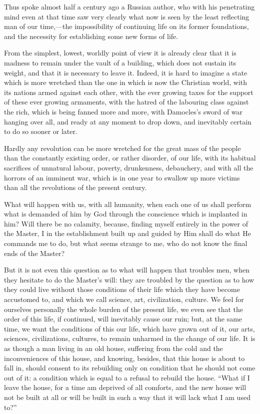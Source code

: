 \documentclass{book}
\begin{document}
Thus spoke almost half a century ago a Russian author, who with his penetrating mind even at that time saw very clearly what now is seen by the least reflecting man of our time,—the impossibility of continuing life on its former foundations, and the necessity for establishing some new forms of life.

From the simplest, lowest, worldly point of view it is already clear that it is madness to remain under the vault of a building, which does not sustain its weight, and that it is necessary to leave it. Indeed, it is hard to imagine a state which is more wretched than the one in which is now the Christian world, with its nations armed against each other, with the ever growing taxes for the support of these ever growing armaments, with the hatred of the labouring class against the rich, which is being fanned more and more, with Damocles’s sword of war hanging over all, and ready at any moment to drop down, and inevitably certain to do so sooner or later.

Hardly any revolution can be more wretched for the great mass of the people than the constantly existing order, or rather disorder, of our life, with its habitual sacrifices of unnatural labour, poverty, drunkenness, debauchery, and with all the horrors of an imminent war, which is in one year to swallow up more victims than all the revolutions of the present century.

What will happen with us, with all humanity, when each one of us shall perform what is demanded of him by God through the conscience which is implanted in him? Will there be no calamity, because, finding myself entirely in the power of the Master, I in the establishment built up and guided by Him shall do what He commands me to do, but what seems strange to me, who do not know the final ends of the Master?

But it is not even this question as to what will happen that troubles men, when they hesitate to do the Master’s will: they are troubled by the question as to how they could live without those conditions of their life which they have become accustomed to, and which we call science, art, civilization, culture. We feel for ourselves personally the whole burden of the present life, we even see that the order of this life, if continued, will inevitably cause our ruin; but, at the same time, we want the conditions of this our life, which have grown out of it, our arts, sciences, civilizations, cultures, to remain unharmed in the change of our life. It is as though a man living in an old house, suffering from the cold and the inconveniences of this house, and knowing, besides, that this house is about to fall in, should consent to its rebuilding only on condition that he should not come out of it: a condition which is equal to a refusal to rebuild the house. “What if I leave the house, for a time am deprived of all comforts, and the new house will not be built at all or will be built in such a way that it will lack what I am used to?”
\end{document}
